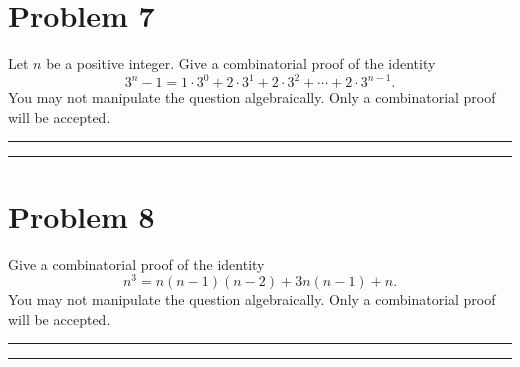 \documentclass{article}
\theoremstyle{definition}
\newenvironment{solution}{\bigskip\hrule{\hfill}}{\bigskip\hrule{\hfill}} %
\begin{document}

\newpage


\section*{Problem 7}
Let $n$ be a positive integer. Give a combinatorial proof of the identity $$3^n-1=1\cdot3^0+2\cdot3^1+2\cdot3^2+\cdots+2\cdot3^{n-1}.$$ You may not manipulate the question algebraically. Only a combinatorial proof will be accepted.
\begin{solution}


\end{solution}


\newpage


\section*{Problem 8}
Give a combinatorial proof of the identity $$n^3=n\left(n-1\right)\left(n-2\right)+3n\left(n-1\right)+n.$$ You may not manipulate the question algebraically. Only a combinatorial proof will be accepted.
\begin{solution}


\end{solution}

\end{document}
